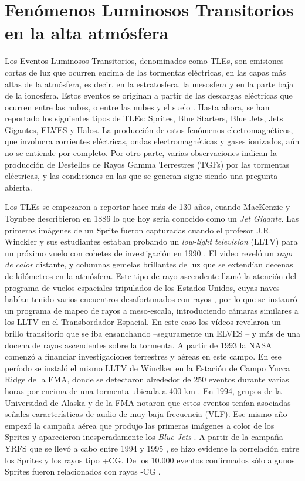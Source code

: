 \documentclass[12pt,oneside,openany,letter]{book}
\begin{document}
\chapter{Fenómenos Luminosos Transitorios en la alta atmósfera}\label{fenomenos}
Los Eventos Luminosos Transitorios, denominados como TLEs, son emisiones cortas de luz que ocurren encima de las tormentas eléctricas, en las capas más altas de la atmósfera, es decir, en la estratosfera, la mesosfera y en la parte baja de la ionosfera. Estos eventos se originan a partir de las descargas eléctricas que ocurren entre las nubes, o entre las nubes y el suelo \cite{DwyerUman2014}. Hasta ahora, se han reportado los siguientes tipos de TLEs: Sprites, Blue Starters, Blue Jets, Jets Gigantes, ELVES y Halos. La producci\'on de estos fenómenos electromagnéticos, que involucra corrientes eléctricas, ondas electromagnéticas y gases ionizados, aún no se entiende por completo. Por otro parte, varias observaciones indican la producción de Destellos de Rayos Gamma Terrestres (TGFs) por las tormentas eléctricas, y las condiciones en las que se generan sigue siendo una pregunta abierta.

Los TLEs se empezaron a reportar hace más de 130 años, cuando MacKenzie y Toynbee describieron en 1886 \cite{FullekrugEtal2006} lo que hoy sería conocido como un \textit{Jet Gigante}. Las primeras imágenes de un Sprite fueron capturadas cuando el profesor J.R. Winckler y sus estudiantes estaban probando un \textit{low-light television} (LLTV) para un próximo vuelo con cohetes de investigación en 1990 \cite{FranzEtal1990}. El video reveló un \textit{rayo de calor} distante, y columnas gemelas brillantes de luz que se extendían decenas de kilómetros en la atmósfera. Este tipo de rayo ascendente llamó la atención del programa de vuelos espaciales tripulados de los Estados Unidos, cuyas naves habían tenido varios encuentros desafortunados con rayos \cite{UmanRakov2003}, por lo que se instauró un programa de mapeo de rayos a meso-escala, introduciendo cámaras similares a los LLTV en el Transbordador Espacial. En este caso los vídeos revelaron un brillo transitorio que se iba ensanchando --seguramente un ELVES -- y más de una docena de rayos ascendentes sobre la tormenta. A partir de 1993 la NASA comenzó a financiar investigaciones terrestres y aéreas en este campo. En ese período se instaló el mismo LLTV de Winclker en la Estación de Campo Yucca Ridge de la FMA, donde se detectaron alrededor de 250 eventos durante varias horas por encima de una tormenta ubicada a 400 km \cite{Lyons1994A, Lyons1994B}. En 1994, grupos de la Universidad de Alaska y de la FMA notaron que estos eventos tenían asociadas señales características de audio de muy baja frecuencia (VLF). Ese mismo año empezó la campaña aérea que produjo las primeras imágenes a color de los Sprites y aparecieron inesperadamente los \textit{Blue Jets} \cite{SentmanEtal1995}. A partir de la campaña YRFS que se llevó a cabo entre 1994 y 1995 \cite{Lyons1996B}, se hizo evidente la correlación entre los Sprites y los rayos tipo +CG. De los 10.000 eventos confirmados sólo algunos Sprites fueron relacionados con rayos -CG \cite{BarringtonEtal1999}. 
\end{document}
